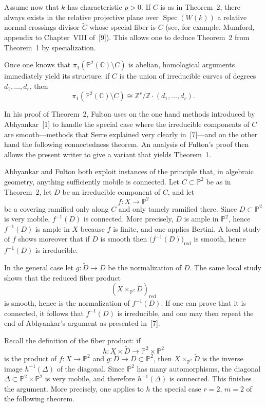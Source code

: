 \documentclass[11pt]{amsart}
\newcommand{\PP}{\mathbb{P}}
\newcommand{\CC}{\mathbb{C}}
\newcommand{\ZZ}{\mathbb{Z}}
\newcommand{\DeltaDiag}{\Delta}
\begin{document}
Assume now that $k$ has characteristic $p>0$. If $C$ is as in Theorem~2, there always exists in the relative projective plane over $\operatorname{Spec}(W(k))$ a relative normal-crossings divisor $\widetilde C$ whose special fiber is $C$ (see, for example, Mumford, appendix to Chapter~VIII of~[9]). This allows one to deduce Theorem~2 from Theorem~1 by specialization.

Once one knows that $\pi_1(\PP^2(\CC)\setminus C)$ is abelian, homological arguments immediately yield its structure: if $C$ is the union of irreducible curves of degrees $d_1,\dots,d_r$, then
\[
\pi_1(\PP^2(\CC)\setminus C)\cong \ZZ^r/\ZZ\cdot(d_1,\dots,d_r).
\]

In his proof of Theorem~2, Fulton uses on the one hand methods introduced by Abhyankar~[1] to handle the special case where the irreducible components of $C$ are smooth---methods that Serre explained very clearly in~[7]---and on the other hand the following connectedness theorem. An analysis of Fulton's proof then allows the present writer to give a variant that yields Theorem~1.

Abhyankar and Fulton both exploit instances of the principle that, in algebraic geometry, anything sufficiently mobile is connected. Let $C\subset \PP^2$ be as in Theorem~2, let $D$ be an irreducible component of $C$, and let
\[
f\colon X\to \PP^2
\]
be a covering ramified only along $C$ and only tamely ramified there. Since $D\subset \PP^2$ is very mobile, $f^{-1}(D)$ is connected. More precisely, $D$ is ample in $\PP^2$, hence $f^{-1}(D)$ is ample in $X$ because $f$ is finite, and one applies Bertini. A local study of $f$ shows moreover that if $D$ is smooth then $\bigl(f^{-1}(D)\bigr)_{\mathrm{red}}$ is smooth, hence $f^{-1}(D)$ is irreducible.

In the general case let $g\colon \widetilde D\to D$ be the normalization of $D$. The same local study shows that the reduced fiber product
\[
(X\times_{\PP^2}\widetilde D)_{\mathrm{red}}
\]
is smooth, hence is the normalization of $f^{-1}(D)$. If one can prove that it is connected, it follows that $f^{-1}(D)$ is irreducible, and one may then repeat the end of Abhyankar's argument as presented in~[7].

Recall the definition of the fiber product: if
\[
h\colon X\times \widetilde D \to \PP^2\times \PP^2
\]
is the product of $f\colon X\to \PP^2$ and $g\colon \widetilde D\to D\subset \PP^2$, then $X\times_{\PP^2}\widetilde D$ is the inverse image $h^{-1}(\DeltaDiag)$ of the diagonal. Since $\PP^2$ has many automorphisms, the diagonal $\DeltaDiag\subset \PP^2\times \PP^2$ is very mobile, and therefore $h^{-1}(\DeltaDiag)$ is connected. This finishes the argument. More precisely, one applies to $h$ the special case $r=2$, $m=2$ of the following theorem.
\end{document}
